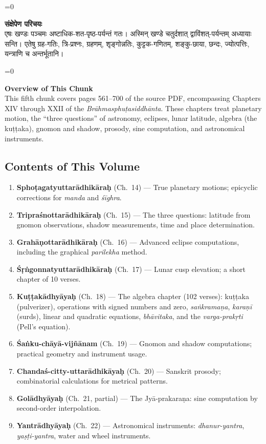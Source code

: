 \documentclass[11pt,a4paper]{article}
\newcommand{\dev}[1]{{\devanagarifont\color{sktcolor}#1}}
\newenvironment{paracol}[1]{\begingroup}{\endgroup}
\newcommand{\switchcolumn}[1][]{%
  \ifnum#1=0\relax\else\par\nobreak\vspace{0.5em}\par\nobreak\fi%
}
\begin{document}
\begin{paracol}{2}
\switchcolumn[0]
\dev{%
\textbf{संक्षेपेण परिचयः}\\[0.3cm]
एषः खण्डः पञ्चमः अष्टाधिक-शत-पृष्ठ-पर्यन्तं गतः।
अस्मिन् खण्डे चतुर्दशात् द्वाविंशत्-पर्यन्तम् अध्यायाः
सन्ति। एतेषु ग्रह-गतिः, त्रि-प्रश्नः, ग्रहणम्, शृङ्गोन्नतिः,
कुट्टक-गणितम्, शङ्कु-छाया, छन्दः, ज्योत्पत्तिः,
यन्त्राणि च अन्तर्भूतानि।
}

\switchcolumn[1]
\textbf{Overview of This Chunk}\\[0.3cm]
This fifth chunk covers pages 561–700 of the source PDF,
encompassing Chapters XIV through XXII of the
\textit{Brāhmasphuṭasiddhānta}. These chapters treat planetary
motion, the ``three questions'' of astronomy, eclipses, lunar
latitude, algebra (the kuṭṭaka), gnomon and shadow, prosody,
sine computation, and astronomical instruments.
\end{paracol}

\vspace{0.5cm}

\subsection*{Contents of This Volume}

\begin{enumerate}[label=\textbf{Ch.~\Roman*:}, wide=0pt]
  \item \textbf{Sphoṭagatyuttarādhikāraḥ} (Ch.~14) — True planetary
    motions; epicyclic corrections for \textit{manda} and \textit{śīghra}.
  \item \textbf{Tripraśnottarādhikāraḥ} (Ch.~15) — The three questions:
    latitude from gnomon observations, shadow measurements, time and
    place determination.
  \item \textbf{Grahāṇottarādhikāraḥ} (Ch.~16) — Advanced eclipse
    computations, including the graphical \textit{parilekha} method.
  \item \textbf{Śṛṅgonnatyuttarādhikāraḥ} (Ch.~17) — Lunar cusp
    elevation; a short chapter of 10 verses.
  \item \textbf{Kuṭṭakādhyāyaḥ} (Ch.~18) — The algebra chapter (102
    verses): kuṭṭaka (pulverizer), operations with signed numbers and
    zero, \textit{saṅkramaṇa}, \textit{karaṇī} (surds), linear and
    quadratic equations, \textit{bhāvitaka}, and the
    \textit{varga-prakṛti} (Pell's equation).
  \item \textbf{Śaṅku-chāyā-vijñānam} (Ch.~19) — Gnomon and shadow
    computations; practical geometry and instrument usage.
  \item \textbf{Chandaś-citty-uttarādhikāyaḥ} (Ch.~20) — Sanskrit
    prosody; combinatorial calculations for metrical patterns.
  \item \textbf{Golādhyāyaḥ} (Ch.~21, partial) — The Jyā-prakaraṇa:
    sine computation by second-order interpolation.
  \item \textbf{Yantrādhyāyaḥ} (Ch.~22) — Astronomical instruments:
    \textit{dhanur-yantra}, \textit{yaṣṭi-yantra}, water and wheel
    instruments.
\end{enumerate}
\end{document}
